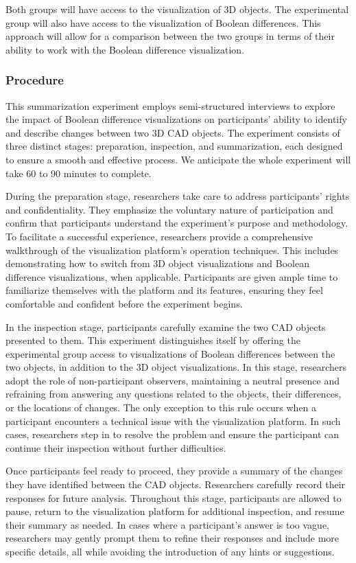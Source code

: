 \documentclass[sigconf,authorversion,nonacm]{acmart}
\begin{document}
Both groups will have access to the visualization of 3D objects. The experimental group will also have access to the visualization of Boolean differences. This approach will allow for a comparison between the two groups in terms of their ability to work with the Boolean difference visualization.
\subsubsection{Procedure}
This summarization experiment employs semi-structured interviews to explore the impact of Boolean difference visualizations on participants' ability to identify and describe changes between two 3D CAD objects.
The experiment consists of three distinct stages: preparation, inspection, and summarization, each designed to ensure a smooth and effective process. We anticipate the whole experiment will take 60 to 90 minutes to complete.

During the preparation stage, researchers take care to address participants' rights and confidentiality. They emphasize the voluntary nature of participation and confirm that participants understand the experiment's purpose and methodology.
To facilitate a successful experience, researchers provide a comprehensive walkthrough of the visualization platform's operation techniques. This includes demonstrating how to switch from 3D object visualizations and Boolean difference visualizations, when applicable.
Participants are given ample time to familiarize themselves with the platform and its features, ensuring they feel comfortable and confident before the experiment begins.

In the inspection stage, participants carefully examine the two CAD objects presented to them. This experiment distinguishes itself by offering the experimental group access to visualizations of Boolean differences between the two objects, in addition to the 3D object visualizations.
In this stage, researchers adopt the role of non-participant observers, maintaining a neutral presence and refraining from answering any questions related to the objects, their differences, or the locations of changes.
The only exception to this rule occurs when a participant encounters a technical issue with the visualization platform.
In such cases, researchers step in to resolve the problem and ensure the participant can continue their inspection without further difficulties.

Once participants feel ready to proceed, they provide a summary of the changes they have identified between the CAD objects. Researchers carefully record their responses for future analysis.
Throughout this stage, participants are allowed to pause, return to the visualization platform for additional inspection, and resume their summary as needed. In cases where a participant's answer is too vague,
researchers may gently prompt them to refine their responses and include more specific details, all while avoiding the introduction of any hints or suggestions.
\end{document}
